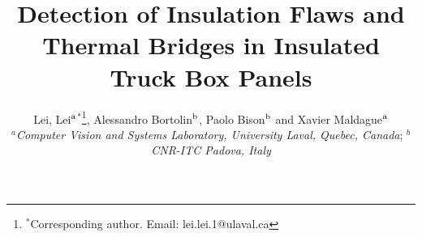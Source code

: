 \documentclass{tQRT2e}
\begin{document}


\title{Detection of Insulation Flaws and Thermal Bridges in Insulated Truck Box Panels}

\author{Lei, Lei$^{\rm a}$$^{\ast}$\thanks{$^\ast$Corresponding author. Email: lei.lei.1@ulaval.ca
\vspace{6pt}},  Alessandro Bortolin$^{\rm b}$, Paolo Bison$^{\rm b}$ and Xavier Maldague$^{\rm a}$\\\vspace{6pt}  $^{a}${\em{Computer Vision and Systems Laboratory, University Laval, Quebec, Canada}};
$^{b}${\em{CNR-ITC Padova, Italy}} \\\received{} }

\maketitle
\end{document}
